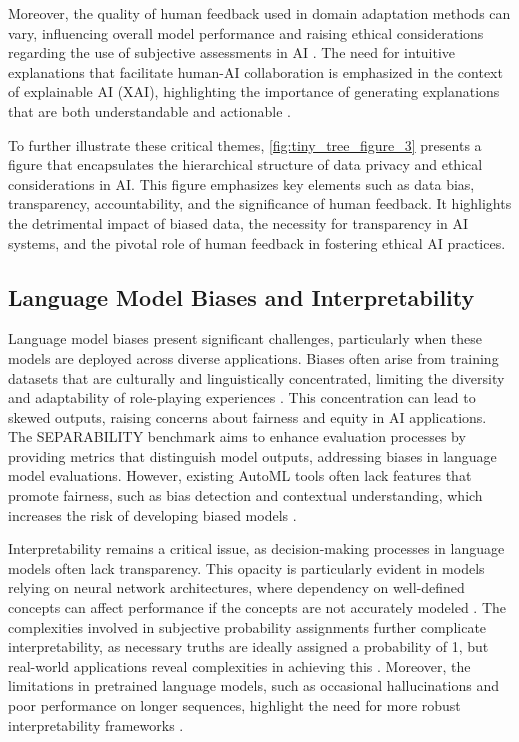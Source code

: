 Moreover, the quality of human feedback used in domain adaptation methods can vary, influencing overall model performance and raising ethical considerations regarding the use of subjective assessments in AI \cite{bogoychev2020domaintranslationesenoisesynthetic}. The need for intuitive explanations that facilitate human-AI collaboration is emphasized in the context of explainable AI (XAI), highlighting the importance of generating explanations that are both understandable and actionable \cite{chiaburu2024copronnconceptbasedprototypicalnearest}.

To further illustrate these critical themes, \autoref{fig:tiny_tree_figure_3} presents a figure that encapsulates the hierarchical structure of data privacy and ethical considerations in AI. This figure emphasizes key elements such as data bias, transparency, accountability, and the significance of human feedback. It highlights the detrimental impact of biased data, the necessity for transparency in AI systems, and the pivotal role of human feedback in fostering ethical AI practices.


\subsection{Language Model Biases and Interpretability} \label{subsec:Language Model Biases and Interpretability}

Language model biases present significant challenges, particularly when these models are deployed across diverse applications. Biases often arise from training datasets that are culturally and linguistically concentrated, limiting the diversity and adaptability of role-playing experiences \cite{tao2024rolecraftglmadvancingpersonalizedroleplaying}. This concentration can lead to skewed outputs, raising concerns about fairness and equity in AI applications. The SEPARABILITY benchmark aims to enhance evaluation processes by providing metrics that distinguish model outputs, addressing biases in language model evaluations. However, existing AutoML tools often lack features that promote fairness, such as bias detection and contextual understanding, which increases the risk of developing biased models \cite{chiaburu2024copronnconceptbasedprototypicalnearest}.



Interpretability remains a critical issue, as decision-making processes in language models often lack transparency. This opacity is particularly evident in models relying on neural network architectures, where dependency on well-defined concepts can affect performance if the concepts are not accurately modeled \cite{chiaburu2024copronnconceptbasedprototypicalnearest}. The complexities involved in subjective probability assignments further complicate interpretability, as necessary truths are ideally assigned a probability of 1, but real-world applications reveal complexities in achieving this \cite{cieslinski2022axiomstypefreesubjectiveprobability}. Moreover, the limitations in pretrained language models, such as occasional hallucinations and poor performance on longer sequences, highlight the need for more robust interpretability frameworks \cite{chowdhery2023palm}.



